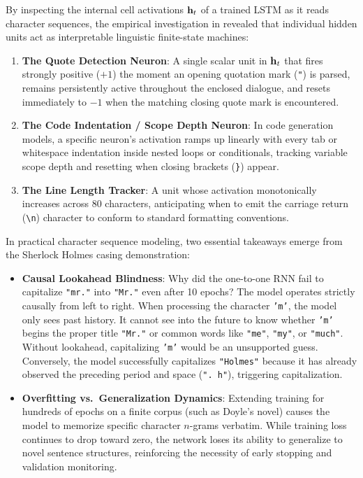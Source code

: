 \documentclass[../../main.tex]{subfiles}
\begin{document}
By inspecting the internal cell activations $\mathbf{h}_t$ of a trained LSTM as it reads character sequences, the empirical investigation in \cite{karpathy2015rnn} revealed that individual hidden units act as interpretable linguistic finite-state machines:
\begin{enumerate}
    \item \textbf{The Quote Detection Neuron}: A single scalar unit in $\mathbf{h}_t$ that fires strongly positive ($+1$) the moment an opening quotation mark (\texttt{"}) is parsed, remains persistently active throughout the enclosed dialogue, and resets immediately to $-1$ when the matching closing quote mark is encountered.
    \item \textbf{The Code Indentation / Scope Depth Neuron}: In code generation models, a specific neuron's activation ramps up linearly with every tab or whitespace indentation inside nested loops or conditionals, tracking variable scope depth and resetting when closing brackets (\texttt{\}}) appear.
    \item \textbf{The Line Length Tracker}: A unit whose activation monotonically increases across 80 characters, anticipating when to emit the carriage return (\texttt{\textbackslash n}) character to conform to standard formatting conventions.
\end{enumerate}

\medskip

In practical character sequence modeling, two essential takeaways emerge from the Sherlock Holmes casing demonstration:
\begin{itemize}
    \item \textbf{Causal Lookahead Blindness}: Why did the one-to-one RNN fail to capitalize \texttt{"mr."} into \texttt{"Mr."} even after 10 epochs? The model operates strictly causally from left to right. When processing the character \texttt{'m'}, the model only sees past history. It cannot see into the future to know whether \texttt{'m'} begins the proper title \texttt{"Mr."} or common words like \texttt{"me"}, \texttt{"my"}, or \texttt{"much"}. Without lookahead, capitalizing \texttt{'m'} would be an unsupported guess. Conversely, the model successfully capitalizes \texttt{"Holmes"} because it has already observed the preceding period and space (\texttt{". h"}), triggering capitalization.
    \item \textbf{Overfitting vs.~Generalization Dynamics}: Extending training for hundreds of epochs on a finite corpus (such as Doyle's novel) causes the model to memorize specific character $n$-grams verbatim. While training loss continues to drop toward zero, the network loses its ability to generalize to novel sentence structures, reinforcing the necessity of early stopping and validation monitoring.
\end{itemize}
\end{document}
